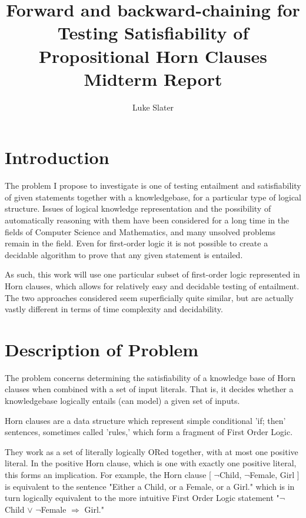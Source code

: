\documentclass{article}
\begin{document}
\title{Forward and backward-chaining for Testing Satisfiability of Propositional Horn Clauses \protect\\ Midterm Report}
\author{Luke Slater}

\maketitle

\section{Introduction}

The problem I propose to investigate is one of testing entailment and
satisfiability of given statements together with a knowledgebase, for a particular 
type of logical structure. Issues of 
logical knowledge representation and the possibility of automatically reasoning
with them have been considered for a long time in the fields of Computer Science
and Mathematics, and many unsolved problems
remain in the field. Even for first-order logic it is not possible to create a
decidable algorithm to prove that any given statement is entailed.

As such, this work will use one particular subset of first-order logic
represented in Horn clauses, which allows for relatively easy and
decidable testing of entailment. The two approaches considered seem
superficially quite similar, but are actually vastly different in terms of
time complexity and decidability.

\section{Description of Problem}

The problem concerns determining the satisfiability of a knowledge base of Horn
clauses when combined with a set of input literals. That is, it decides whether
a knowledgebase logically entails (can model) a given set of inputs.

Horn clauses are a data structure which represent simple conditional 'if; then'
sentences, sometimes called 'rules,' which form a fragment of First Order Logic.

They work as a set of literally logically ORed together, with at most one
positive literal. In the positive Horn clause, which is one with exactly one
positive literal, this forms an implication. For example, the Horn clause 
[ $\neg$Child, $\neg$Female, Girl ] is equivalent to the sentence "Either a
Child, or a Female, or a Girl." which is in turn logically equivalent to the
more intuitive First Order Logic statement 
"$\neg$Child $\vee$ $\neg$Female $\Rightarrow$ Girl."
\end{document}
